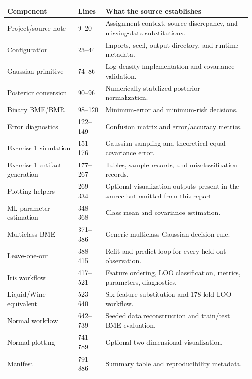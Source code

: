 \documentclass[11pt,a4paper]{article}
\begin{document}
\begin{longtable}{@{}p{}p{}p{}@{}}
\toprule
\textbf{Component} & \textbf{Lines} & \textbf{What the source establishes}\\
\midrule
Project/source note & 9--20 & Assignment context, source discrepancy, and missing-data substitutions.\\
Configuration & 23--44 & Imports, seed, output directory, and runtime metadata.\\
Gaussian primitive & 74--86 & Log-density implementation and covariance validation.\\
Posterior conversion & 90--96 & Numerically stabilized posterior normalization.\\
Binary BME/BMR & 98--120 & Minimum-error and minimum-risk decisions.\\
Error diagnostics & 122--149 & Confusion matrix and error/accuracy metrics.\\
Exercise 1 simulation & 151--176 & Gaussian sampling and theoretical equal-covariance error.\\
Exercise 1 artifact generation & 177--267 & Tables, sample records, and misclassification records.\\
Plotting helpers & 269--334 & Optional visualization outputs present in the source but omitted from this report.\\
ML parameter estimation & 348--368 & Class mean and covariance estimation.\\
Multiclass BME & 371--386 & Generic multiclass Gaussian decision rule.\\
Leave-one-out & 388--415 & Refit-and-predict loop for every held-out observation.\\
Iris workflow & 417--521 & Feature ordering, LOO classification, metrics, parameters, diagnostics.\\
Liquid/Wine-equivalent & 523--640 & Six-feature substitution and 178-fold LOO workflow.\\
Normal workflow & 642--739 & Seeded data reconstruction and train/test BME evaluation.\\
Normal plotting & 741--789 & Optional two-dimensional visualization.\\
Manifest & 791--886 & Summary table and reproducibility metadata.\\
\bottomrule
\end{longtable}
\end{document}
